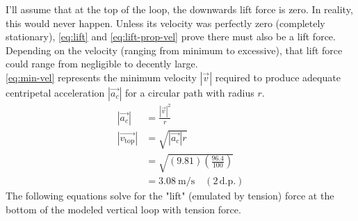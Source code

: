 \documentclass[11pt, a4paper]{article}
\begin{document}
	I'll assume that at the top of the loop, the downwards lift force is zero. In reality, this would never happen. Unless its velocity was perfectly zero (completely stationary), \cref{eq:lift} and \cref{eq:lift-prop-vel} prove there must also be a lift force. Depending on the velocity (ranging from minimum to excessive), that lift force could range from negligible to decently large.\\
	\cref{eq:min-vel} represents the minimum velocity $|\vec{v}|$ required to produce adequate centripetal acceleration $|\vec{a_c}|$ for a circular path with radius $r$.
	\begin{align}
		|\vec{a_c}|&=\frac{|\vec{v}|^2}{r}\\
		|\vec{v_{\text{top}}}|&=\sqrt{|\vec{a_c}|r} \label{eq:min-vel}\\
		&=\sqrt{(9.81)\left(\frac{96.4}{100}\right)}\\
		&=\SI{3.08}{\meter\per\second} \quad (2\, \text{d.p.})
	\end{align}
	The following equations solve for the "lift" (emulated by tension) force at the bottom of the modeled vertical loop with tension force.
\end{document}
